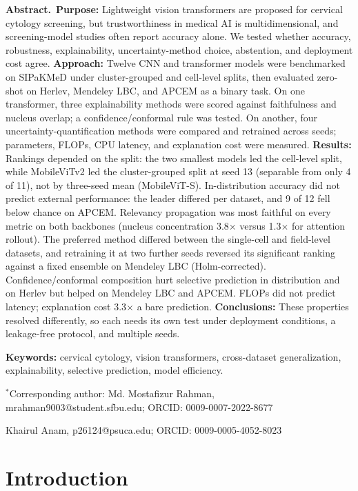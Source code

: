 \documentclass[12pt,letterpaper]{article}
\begin{document}
{\fontsize{10}{12}\selectfont
\noindent\textbf{Abstract.}\ \textbf{Purpose:}
Lightweight vision transformers are proposed for cervical cytology screening, but trustworthiness in medical AI is multidimensional, and screening-model studies often report accuracy alone. We tested whether accuracy, robustness, explainability, uncertainty-method choice, abstention, and deployment cost agree.
\textbf{Approach:}
Twelve CNN and transformer models were benchmarked on SIPaKMeD under cluster-grouped and cell-level splits, then evaluated zero-shot on Herlev, Mendeley LBC, and APCEM as a binary task. On one transformer, three explainability methods were scored against faithfulness and nucleus overlap; a confidence/conformal rule was tested. On another, four uncertainty-quantification methods were compared and retrained across seeds; parameters, FLOPs, CPU latency, and explanation cost were measured.
\textbf{Results:}
Rankings depended on the split: the two smallest models led the cell-level split, while MobileViTv2 led the cluster-grouped split at seed 13 (separable from only 4 of 11), not by three-seed mean (MobileViT-S). In-distribution accuracy did not predict external performance: the leader differed per dataset, and 9 of 12 fell below chance on APCEM. Relevancy propagation was most faithful on every metric on both backbones (nucleus concentration 3.8$\times$ versus 1.3$\times$ for attention rollout). The preferred method differed between the single-cell and field-level datasets, and retraining it at two further seeds reversed its significant ranking against a fixed ensemble on Mendeley LBC (Holm-corrected). Confidence/conformal composition hurt selective prediction in distribution and on Herlev but helped on Mendeley LBC and APCEM. FLOPs did not predict latency; explanation cost 3.3$\times$ a bare prediction.
\textbf{Conclusions:}
These properties resolved differently, so each needs its own test under deployment conditions, a leakage-free protocol, and multiple seeds.

\medskip
\noindent\textbf{Keywords:} cervical cytology, vision transformers, cross-dataset generalization, explainability, selective prediction, model efficiency.

\medskip
\noindent$^{*}$Corresponding author: Md. Mostafizur Rahman, mrahman9003@student.sfbu.edu; ORCID: 0009-0007-2022-8677

\noindent Khairul Anam, p26124@psuca.edu; ORCID: 0009-0005-4052-8023
}


\section{Introduction}
\label{sec:intro}
\end{document}
